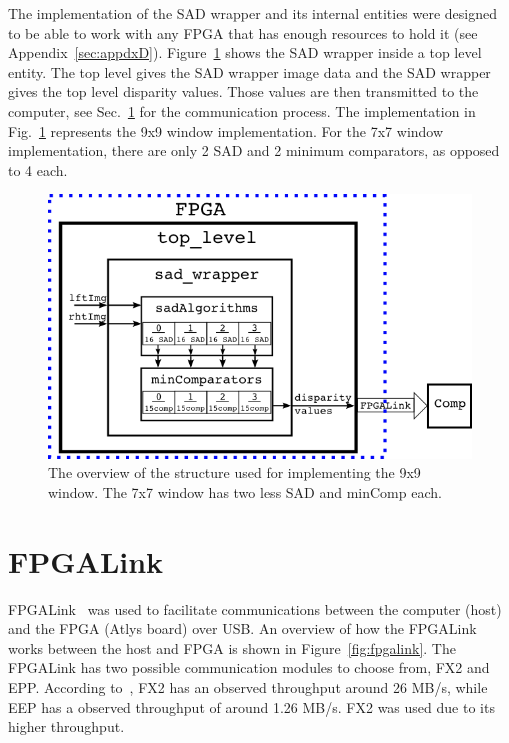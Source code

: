 The implementation of the SAD wrapper and its internal entities were designed to be able to work with any FPGA that has enough resources to hold it (see Appendix~\ref{sec:appdxD}). Figure~\ref{fig:topLevel_rtl} shows the SAD wrapper inside a top level entity. The top level gives the SAD wrapper image data and the SAD wrapper gives the top level disparity values. Those values are then transmitted to the computer, see Sec.~\ref{sec:fpgalink} for the communication process. The implementation in Fig.~\ref{fig:topLevel_rtl} represents the 9x9 window implementation. For the 7x7 window implementation, there are only 2 SAD and 2 minimum comparators, as opposed to 4 each.

\begin{figure}[h]
	\begin{center}
		\includegraphics[width=150mm]{figures/top_level_rtl.png}
		\captionfonts
		\caption{The overview of the structure used for implementing the 9x9 window. The 7x7 window has two less SAD and minComp each.}
		\label{fig:topLevel_rtl}
	\end{center}
\end{figure}

\section{FPGALink}
\label{sec:fpgalink}

FPGALink~\cite{fpgalink} was used to facilitate communications between the computer (host) and the FPGA (Atlys board) over USB. An overview of how the FPGALink works between the host and FPGA is shown in Figure~\ref{fig:fpgalink}. The FPGALink has two possible communication modules to choose from, FX2 and EPP. According to~\cite{fpgalink}, FX2 has an observed throughput around 26 MB/s, while EEP has a observed throughput of around 1.26 MB/s. FX2 was used due to its higher throughput.

